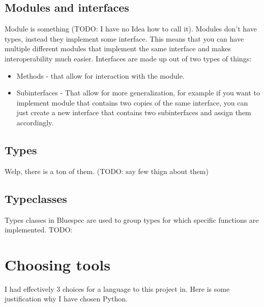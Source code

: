 \documentclass[14pt]{report}
\begin{document}
\subsection{Modules and interfaces}
Module is something (TODO: I have no Idea how to call it). Modules don't have types, instead they implement some interface. This means that you can have multiple different modules that implement the same interface and makes interoperability much easier. Interfaces are made up out of two types of things:
    \begin{itemize}
        \item Methods - that allow for interaction with the module.
        \item Subinterfaces - That allow for more generalization, for example if you want to implement module that contains two copies of the same interface, you can just create a new interface that contains two subinterfaces and assign them accordingly.
    \end{itemize}

\subsection{Types}
Welp, there is a ton of them. (TODO: say few thign about them)
\subsection{Typeclasses}
Types classes in Bluespec are used to group types for which specific functions are implemented. TODO:

\section{Choosing tools}
I had effectively 3 choices for a language to this project in. Here is some justification why I have chosen Python. 
\end{document}
